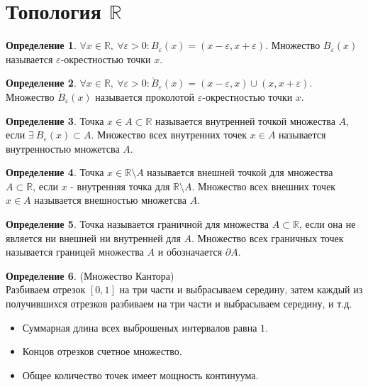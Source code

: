 \documentclass[a4paper, 12pt]{article}
\newcommand{\R}{\mathbb{R}}
\renewcommand{\epsilon}{\varepsilon}
\theoremstyle{definition}
\newtheorem*{definition}{Определение}
\begin{document}
    \section{Топология $\R$}
        \begin{definition}
            $\forall x\in \R,\ \forall \epsilon>0: B_{\epsilon}(x)=(x-\epsilon, x+\epsilon)$. Множество $B_{\epsilon}(x)$ называется $\epsilon$-окрестностью точки $x$.
        \end{definition}
        \begin{definition}
            $\forall x\in \R,\ \forall \epsilon>0: \mathring{B}_{\epsilon}(x)=(x-\epsilon,x)\cup(x,x+\epsilon)$.  Множество $\mathring{B}_{\epsilon}(x)$ называется проколотой $\epsilon$-окрестностью точки $x$.
        \end{definition} 
        \begin{definition}
            Точка $x\in A\subset \R$ называется внутренней точкой множества $A$, если $\exists \ B_{\epsilon}(x)\subset A$. Множество всех внутренних точек $x\in A$ называется внутренностью множетсва $A$.
        \end{definition} 
        \begin{definition}
            Точка $x\in \R\setminus A$ называется внешней точкой для множества $A\subset \R$, если $x$ - внутренняя точка для $\R\setminus A$. Множество всех внешних точек $x\in A$ называется внешностью множетсва $A$.
        \end{definition}
        \begin{definition}
            Точка называется граничной для множества $A\subset \R$, если она не является ни внешней ни внутренней для $A$. Множество всех граничных точек называется границей множества $A$ и обозначается $\partial A$.
        \end{definition}
        \begin{definition} (Множество Кантора)\\
            Разбиваем отрезок $[0,1]$ на три части и выбрасываем середину, затем каждый из получившихся отрезков разбиваем на три части и выбрасываем середину, и т.д.
            \begin{itemize}
                \item Суммарная длина всех выброшеных интервалов равна $1$.
                \item Концов отрезков счетное множество.
                \item Общее количество точек имеет мощность континуума.
            \end{itemize}
        \end{definition} 
\end{document}
